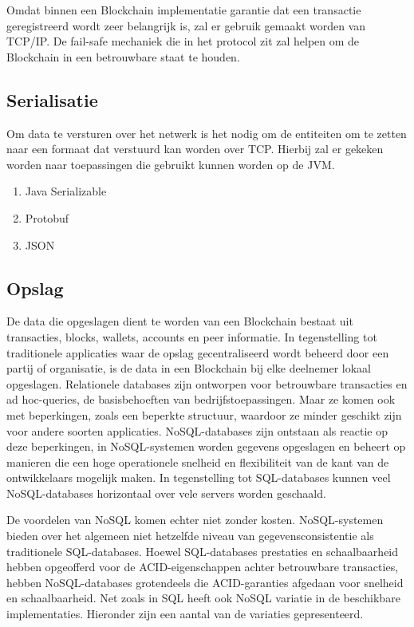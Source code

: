 Omdat binnen een Blockchain implementatie garantie dat een transactie geregistreerd wordt zeer belangrijk is, zal er gebruik gemaakt worden van TCP/IP. De fail-safe mechaniek die in het protocol zit zal helpen om de Blockchain in een betrouwbare staat te houden.

\newpage
\subsection{Serialisatie}

Om data te versturen over het netwerk is het nodig om de entiteiten om te zetten naar een formaat dat verstuurd kan worden over \acrshort{TCP}. Hierbij zal er gekeken worden naar toepassingen die gebruikt kunnen worden op de \acrfull{JVM}.

\begin{enumerate}
  \item Java Serializable
  \item Protobuf
  \item JSON
\end{enumerate}

\subsection{Opslag}

De data die opgeslagen dient te worden van een Blockchain bestaat uit transacties, blocks, wallets, accounts en peer informatie. In tegenstelling tot traditionele applicaties waar de opslag gecentraliseerd wordt beheerd door een partij of organisatie, is de data in een Blockchain bij elke deelnemer lokaal opgeslagen. Relationele databases zijn ontworpen voor betrouwbare transacties en ad hoc-queries, de basisbehoeften van bedrijfstoepassingen. Maar ze komen ook met beperkingen, zoals een beperkte structuur, waardoor ze minder geschikt zijn voor andere soorten applicaties. NoSQL-databases zijn ontstaan als reactie op deze beperkingen, in NoSQL-systemen worden gegevens opgeslagen en beheert op manieren die een hoge operationele snelheid en flexibiliteit van de kant van de ontwikkelaars mogelijk maken. In tegenstelling tot SQL-databases kunnen veel NoSQL-databases horizontaal over vele servers worden geschaald.

De voordelen van NoSQL komen echter niet zonder kosten. NoSQL-systemen bieden over het algemeen niet hetzelfde niveau van gegevensconsistentie als traditionele SQL-databases. Hoewel SQL-databases prestaties en schaalbaarheid hebben opgeofferd voor de ACID-eigenschappen achter betrouwbare transacties, hebben NoSQL-databases grotendeels die ACID-garanties afgedaan voor snelheid en schaalbaarheid. Net zoals in SQL heeft ook NoSQL variatie in de beschikbare implementaties. Hieronder zijn een aantal van de variaties gepresenteerd.

